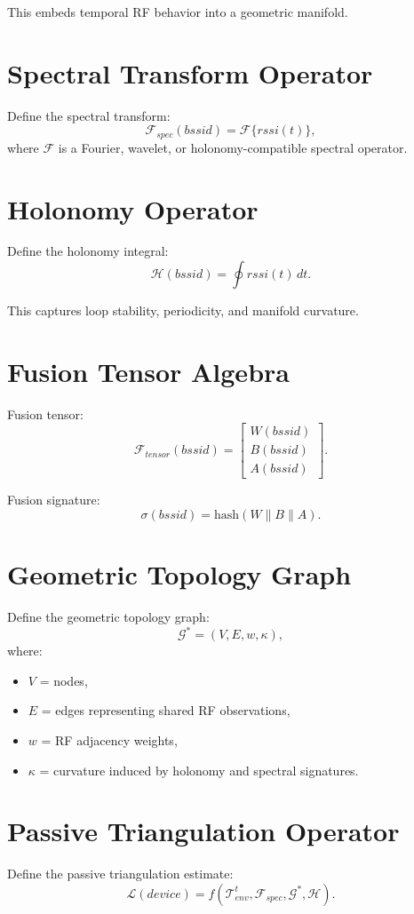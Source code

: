 \documentclass[11pt]{article}
\begin{document}
This embeds temporal RF behavior into a geometric manifold.

\section{Spectral Transform Operator}
Define the spectral transform:
\[
\mathcal{F}_{spec}(bssid) = \mathcal{F}\{rssi(t)\},
\]
where $\mathcal{F}$ is a Fourier, wavelet, or holonomy-compatible spectral operator.

\section{Holonomy Operator}
Define the holonomy integral:
\[
\mathcal{H}(bssid) = \oint rssi(t)\, dt.
\]

This captures loop stability, periodicity, and manifold curvature.

\section{Fusion Tensor Algebra}
Fusion tensor:
\[
\mathcal{F}_{tensor}(bssid) =
\begin{bmatrix}
W(bssid) \\
B(bssid) \\
A(bssid)
\end{bmatrix}.
\]

Fusion signature:
\[
\sigma(bssid) = \mathrm{hash}(W \parallel B \parallel A).
\]

\section{Geometric Topology Graph}
Define the geometric topology graph:
\[
\mathcal{G}^{\ast} = (V,E,w,\kappa),
\]
where:
\begin{itemize}
\item $V$ = nodes,
\item $E$ = edges representing shared RF observations,
\item $w$ = RF adjacency weights,
\item $\kappa$ = curvature induced by holonomy and spectral signatures.
\end{itemize}

\section{Passive Triangulation Operator}
Define the passive triangulation estimate:
\[
\mathcal{L}(device)
= f(\mathcal{T}_{env}^{t},\mathcal{F}_{spec},\mathcal{G}^{\ast},\mathcal{H}).
\]
\end{document}
